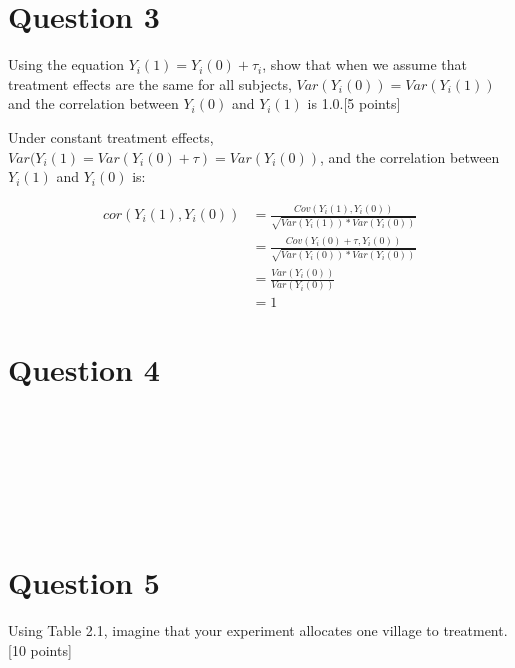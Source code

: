 \documentclass[11pt,notitlepage]{article}\usepackage[]{graphicx}\usepackage[]{color}
\makeatletter
\newenvironment{kframe}{%
 \def\at@end@of@kframe{}%
 \ifinner\ifhmode%
  \def\at@end@of@kframe{\end{minipage}}%
  \begin{minipage}{\columnwidth}%
 \fi\fi%
 \def\FrameCommand##1{\hskip\@totalleftmargin \hskip-\fboxsep
 \colorbox{shadecolor}{##1}\hskip-\fboxsep
     \hskip-\linewidth \hskip-\@totalleftmargin \hskip\columnwidth}%
 \MakeFramed {\advance\hsize-\width
   \@totalleftmargin\z@ \linewidth\hsize
   \@setminipage}}%
 {\par\unskip\endMakeFramed%
 \at@end@of@kframe}
\newenvironment{knitrout}{}{} %
\makeatother
\begin{document}
\section*{Question 3}
Using the equation $Y_i (1) = Y_i (0) + \tau_i$, show that when we assume that treatment effects are the same for all subjects, 
$Var(Y_i(0))= Var(Y_i(1))$ and the correlation between $Y_i (0)$ and $Y_i (1)$ is 1.0.[5 points]

Under constant treatment effects,  $Var(Y_i (1)=Var(Y_i (0)+\tau)=Var(Y_i (0))$, and the correlation between $Y_i(1)$ and $Y_i(0)$ is:

\begin{align*}
cor(Y_i(1), Y_i(0)) &= \frac{Cov(Y_i(1), Y_i(0))}{\sqrt{Var(Y_i(1)) * Var(Y_i(0))}} \\
&=\frac{Cov(Y_i(0) + \tau, Y_i(0))}{\sqrt{Var(Y_i(0)) * Var(Y_i(0))}} \\
& = \frac{Var(Y_{i}(0))}{Var(Y_{i}(0))}\\
&= 1
\end{align*}

\section*{Question 4}
\begin{knitrout}
\color{fgcolor}\begin{kframe}
\begin{verbatim}








\end{verbatim}
\end{kframe}
\end{knitrout}


\section*{Question 5}
Using Table 2.1, imagine that your experiment allocates one village to treatment. [10 points]
\end{document}
